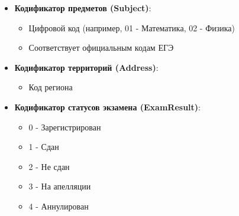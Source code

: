 \documentclass[a4paper]{article}
\begin{document}
\begin{itemize}
      \item \textbf{Кодификатор предметов (Subject)}:
            \begin{itemize}
                  \item Цифровой код (например, 01 - Математика, 02 - Физика)
                  \item Соответствует официальным кодам ЕГЭ
            \end{itemize}

      \item \textbf{Кодификатор территорий (Address)}:
            \begin{itemize}
                  \item Код региона
            \end{itemize}

      \item \textbf{Кодификатор статусов экзамена (ExamResult)}:
            \begin{itemize}
                  \item 0 - Зарегистрирован
                  \item 1 - Сдан
                  \item 2 - Не сдан
                  \item 3 - На апелляции
                  \item 4 - Аннулирован
            \end{itemize}
\end{itemize}
\end{document}
